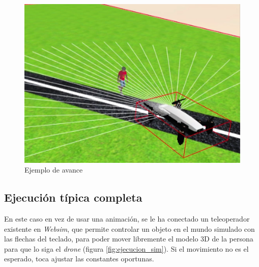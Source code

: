 \begin{figure}[!htb]
\endminipage\hfill
{}
    \includegraphics[width=\linewidth]{figures/simulado/avance_3.png}
\endminipage\hfill
\caption{Ejemplo de avance}
\label{fig:sim_avance}
\end{figure}
\subsection*{Ejecución típica completa}
En este caso en vez de usar una animación, se le ha conectado un teleoperador existente en \textit{Websim}, que permite controlar un objeto en el mundo simulado con las flechas del teclado, para poder mover libremente el modelo 3D de la persona para que lo siga el \textit{drone} (figura \ref{fig:ejecucion_sim}). Si el movimiento no es el esperado, toca ajustar las constantes oportunas.

